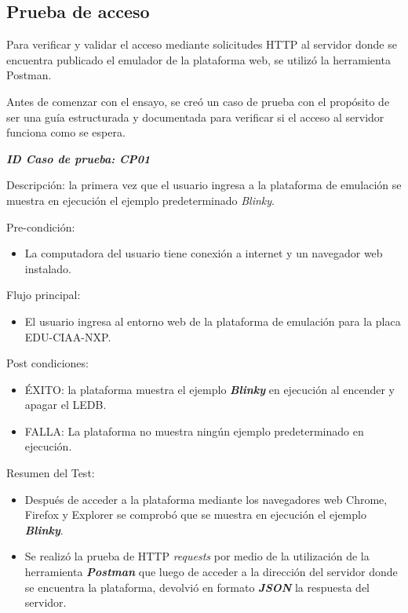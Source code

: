 \subsection{Prueba de acceso}    

Para verificar y validar el acceso mediante solicitudes HTTP al servidor donde se encuentra publicado el emulador de la plataforma web, se utilizó la herramienta Postman.

Antes de comenzar con el ensayo, se creó un caso de prueba con el propósito de ser una guía estructurada y documentada para verificar si el acceso al servidor funciona como se espera.


\textit{\textbf{ID Caso de prueba: CP01}}

Descripción: la primera vez que el usuario ingresa a la plataforma de emulación se muestra en ejecución el ejemplo predeterminado \textit{Blinky}.

Pre-condición: 
\begin{itemize}
	\item La computadora del usuario tiene conexión a internet y un navegador web instalado.
\end{itemize}

Flujo principal:
\begin{itemize}
	\item El usuario ingresa al entorno web de la plataforma de emulación para la placa EDU-CIAA-NXP.
\end{itemize}
Post condiciones:
\begin{itemize}
	\item ÉXITO: la plataforma muestra el ejemplo \textit{\textbf{Blinky}} en ejecución al encender y apagar el LEDB.
	\item FALLA: La plataforma no muestra ningún ejemplo predeterminado en ejecución.
\end{itemize}

Resumen del Test:
\begin{itemize}
	\item Después de acceder a la plataforma mediante los navegadores web Chrome, Firefox y Explorer se comprobó que se muestra en ejecución el ejemplo \textit{\textbf{Blinky}}.
	\item Se realizó la prueba de HTTP \textit{requests} por medio de la utilización de la herramienta \textit{\textbf{Postman}} que luego de acceder a la dirección del servidor donde se encuentra la plataforma, devolvió en formato \textit{\textbf{JSON}} la respuesta del servidor.
\end{itemize}


